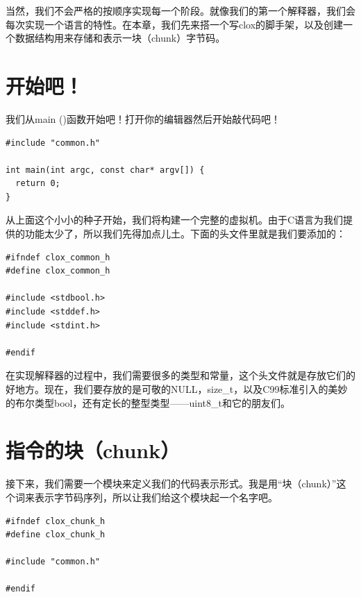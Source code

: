 \documentclass[cn,10pt,math=newtx,citestyle=gb7714-2015,bibstyle=gb7714-2015]{elegantbook}
\newenvironment{code}{\captionsetup{type=listing}}{}
\begin{document}
当然，我们不会严格的按顺序实现每一个阶段。就像我们的第一个解释器，我们会每次实现一个语言的特性。在本章，我们先来搭一个写clox的脚手架，以及创建一个数据结构用来存储和表示一块（chunk）字节码。

\section{开始吧！}

我们从main ()函数开始吧！打开你的编辑器然后开始敲代码吧！

\begin{code}
\begin{verbatim}
#include "common.h"

int main(int argc, const char* argv[]) {
  return 0;
}
\end{verbatim}
\end{code}

从上面这个小小的种子开始，我们将构建一个完整的虚拟机。由于C语言为我们提供的功能太少了，所以我们先得加点儿土。下面的头文件里就是我们要添加的：

\begin{code}
\begin{verbatim}
#ifndef clox_common_h
#define clox_common_h

#include <stdbool.h>
#include <stddef.h>
#include <stdint.h>

#endif
\end{verbatim}
\end{code}

在实现解释器的过程中，我们需要很多的类型和常量，这个头文件就是存放它们的好地方。现在，我们要存放的是可敬的NULL，size\_t，以及C99标准引入的美妙的布尔类型bool，还有定长的整型类型——uint8\_t和它的朋友们。

\section{指令的块（chunk）}

接下来，我们需要一个模块来定义我们的代码表示形式。我是用“块（chunk）”这个词来表示字节码序列，所以让我们给这个模块起一个名字吧。

\begin{code}
\begin{verbatim}
#ifndef clox_chunk_h
#define clox_chunk_h

#include "common.h"

#endif
\end{verbatim}
\end{code}
\end{document}
